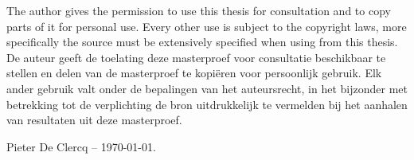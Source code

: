 
\vspace*{6in}

\noindent The author gives the permission to use this thesis for consultation and to copy parts of it for personal use. Every other use is subject to the copyright laws, more specifically the source must be extensively specified when using from this thesis.\\

\noindent De auteur geeft de toelating deze masterproef voor consultatie beschikbaar te stellen en delen van de masterproef te kopi\"eren voor persoonlijk gebruik. Elk ander gebruik valt onder de bepalingen van het auteursrecht, in het bijzonder met betrekking tot de verplichting de bron uitdrukkelijk te vermelden bij het aanhalen van resultaten uit deze masterproef.\\


\noindent Pieter De Clercq -- \today.